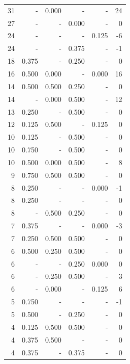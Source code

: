 \documentclass[a4paper]{article}\usepackage{graphicx, color}
\begin{document}
\begin{table}[ht]
\begin{tabular}{rrrrrr}
  31 & - & 0.000 & - & - & 24 \\ 
   \rowcolor{sosoColor} 27 & - & - & 0.000 & - & 0 \\ 
   \rowcolor{nullColor} 24 & - & - & - & 0.125 & -6 \\ 
   \rowcolor{sosoColor} 24 & - & - & 0.375 & - & -1 \\ 
   \rowcolor{sosoColor} 18 & 0.375 & - & 0.250 & - & 0 \\ 
  16 & 0.500 & 0.000 & - & 0.000 & 16 \\ 
   \rowcolor{badColor} 14 & 0.500 & 0.500 & 0.250 & - & 0 \\ 
   \rowcolor{badColor} 14 & - & 0.000 & 0.500 & - & 12 \\ 
   \rowcolor{sosoColor} 13 & 0.250 & - & 0.500 & - & 0 \\ 
  12 & 0.125 & 0.500 & - & 0.125 & 0 \\ 
   \rowcolor{sosoColor} 10 & 0.125 & - & 0.500 & - & 0 \\ 
   \rowcolor{sosoColor} 10 & 0.750 & - & 0.500 & - & 0 \\ 
   \rowcolor{badColor} 10 & 0.500 & 0.000 & 0.500 & - & 8 \\ 
   \rowcolor{goodColor} 9 & 0.750 & 0.500 & 0.500 & - & 0 \\ 
   \rowcolor{nullColor} 8 & 0.250 & - & - & 0.000 & -1 \\ 
   \rowcolor{nullColor} 8 & 0.250 & - & - & - & 0 \\ 
   \rowcolor{badColor} 8 & - & 0.500 & 0.250 & - & 0 \\ 
   \rowcolor{nullColor} 7 & 0.375 & - & - & 0.000 & -3 \\ 
   \rowcolor{goodColor} 7 & 0.250 & 0.500 & 0.500 & - & 0 \\ 
   \rowcolor{badColor} 6 & 0.500 & 0.250 & 0.500 & - & 0 \\ 
   \rowcolor{sosoColor} 6 & - & - & 0.250 & 0.000 & 0 \\ 
   \rowcolor{badColor} 6 & - & 0.250 & 0.500 & - & 3 \\ 
  6 & - & 0.000 & - & 0.125 & 6 \\ 
   \rowcolor{nullColor} 5 & 0.750 & - & - & - & -1 \\ 
   \rowcolor{sosoColor} 5 & 0.500 & - & 0.250 & - & 0 \\ 
   \rowcolor{goodColor} 4 & 0.125 & 0.500 & 0.500 & - & 0 \\ 
  4 & 0.375 & 0.500 & - & - & 0 \\ 
   \rowcolor{sosoColor} 4 & 0.375 & - & 0.375 & - & 0 \\ 

\end{tabular}
\end{table}
\end{document}
